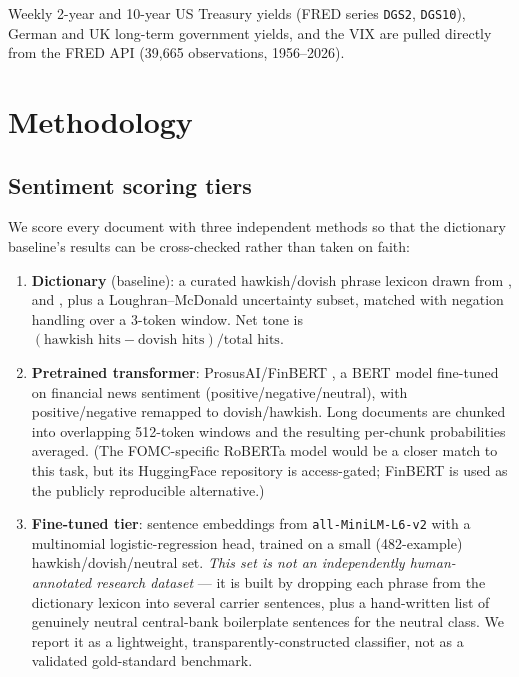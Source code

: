 \documentclass[11pt]{article}
\begin{document}
Weekly 2-year and 10-year US Treasury yields (FRED series \texttt{DGS2},
\texttt{DGS10}), German and UK long-term government yields, and the VIX
are pulled directly from the FRED API (39,665 observations, 1956--2026).

\section{Methodology}

\subsection{Sentiment scoring tiers}

We score every document with three independent methods so that the
dictionary baseline's results can be cross-checked rather than taken on
faith:

\begin{enumerate}
  \item \textbf{Dictionary} (baseline): a curated hawkish/dovish phrase
    lexicon drawn from \citet{apel2012information},
    \citet{hansen2016shocking} and \citet{bennani2017home}, plus a
    Loughran--McDonald \citep{loughran2011liability} uncertainty subset,
    matched with negation handling over a 3-token window. Net tone is
    $(\text{hawkish hits} - \text{dovish hits}) / \text{total hits}$.
  \item \textbf{Pretrained transformer}: ProsusAI/FinBERT
    \citep{araci2019finbert}, a BERT model fine-tuned on financial news
    sentiment (positive/negative/neutral), with positive/negative remapped
    to dovish/hawkish. Long documents are chunked into overlapping
    512-token windows and the resulting per-chunk probabilities averaged.
    (The FOMC-specific \citet{shah2023trillion} RoBERTa model would be a
    closer match to this task, but its HuggingFace repository is
    access-gated; FinBERT is used as the publicly reproducible
    alternative.)
  \item \textbf{Fine-tuned tier}: sentence embeddings from
    \texttt{all-MiniLM-L6-v2} \citep{reimers2019sentencebert} with a
    multinomial logistic-regression head, trained on a small
    (482-example) hawkish/dovish/neutral set. \emph{This set is not an
    independently human-annotated research dataset} --- it is built by
    dropping each phrase from the dictionary lexicon into several carrier
    sentences, plus a hand-written list of genuinely neutral central-bank
    boilerplate sentences for the neutral class. We report it as a
    lightweight, transparently-constructed classifier, not as a validated
    gold-standard benchmark.
\end{enumerate}
\end{document}
